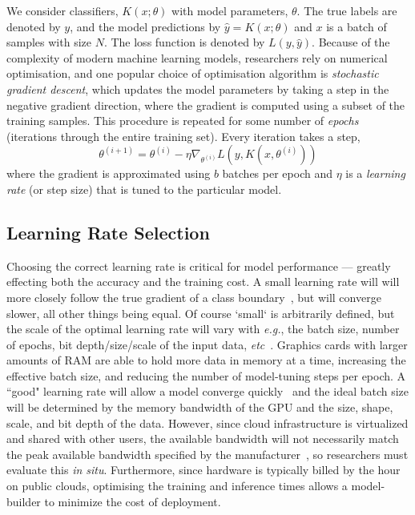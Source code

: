 \documentclass[journal]{IEEEtran}
\begin{document}
We consider classifiers, $K(x; \theta)$ with model parameters, $\theta$. The true labels are denoted by $y$, and the model predictions by $\hat{y} = K(x; \theta)$ and $x$ is a batch of samples with size $N$. The loss function is denoted by $L(y, \hat{y})$.
Because of the complexity of modern machine learning models, researchers rely on numerical optimisation, and one popular choice of optimisation algorithm is \textit{stochastic gradient descent}, which updates the model parameters by taking a step in the negative gradient direction, where the gradient is computed using a subset of the training samples.
This procedure is repeated for some number of \textit{epochs} (iterations through the entire training set). Every iteration takes a step,
\begin{equation}
    \theta^{(i+1)} = \theta^{(i)} - \eta \nabla_{\theta^{(i)}} L(y, K(x, \theta^{(i)}))
    \label{eq:sgd}
\end{equation}
where the gradient is approximated using $b$ batches per epoch and $\eta$ is a \textit{learning rate} (or step size) that is tuned to the particular model.

\subsection{Learning Rate Selection}
\label{learning_rate}

Choosing the correct learning rate is critical for model performance --- greatly effecting both the accuracy and the training cost. A small learning rate will will more closely follow the true gradient of a class boundary~\cite{cao2019generalization}, but will converge slower, all other things being equal. Of course `small` is arbitrarily defined, but the scale of the optimal learning rate will vary with \textit{e.g.}, the batch size, number of epochs, bit depth/size/scale of the input data, \textit{etc}~\cite{granziol2022learning}. Graphics cards with larger amounts of RAM are able to hold more data in memory at a time, increasing the effective batch size, and reducing the number of model-tuning steps per epoch. A ``good" learning rate will allow a model converge quickly~\cite{smith2019super,granziol2022learning} and the ideal batch size will be determined by the memory bandwidth of the GPU and the size, shape, scale, and bit depth of the data. However, since cloud infrastructure is virtualized and shared with other users, the available bandwidth will not necessarily match the peak available bandwidth specified by the manufacturer~\cite{sajid2013cloud}, so researchers must evaluate this \textit{in situ}. Furthermore, since hardware is typically billed by the hour on public clouds, optimising the training and inference times allows a model-builder to minimize the cost of deployment. 
\end{document}

